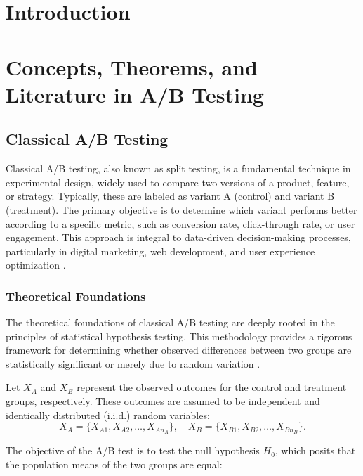 \documentclass[magisterska, english]{pwr_wmat_praca_dyplomowa}
\theoremstyle{plain}
\numberwithin{theorem}{chapter}
\theoremstyle{definition}
\numberwithin{theorem}{chapter}
\begin{document}
\frontmatter
\maketitle
\mainmatter
\tableofcontents
{\backmatter \chapter{Introduction}} 

\chapter{Concepts, Theorems, and Literature in A/B Testing}


\section{Classical A/B Testing}

Classical A/B testing, also known as split testing, is a fundamental technique in experimental design, widely used to compare two versions of a product, feature, or strategy. Typically, these are labeled as variant A (control) and variant B (treatment). The primary objective is to determine which variant performs better according to a specific metric, such as conversion rate, click-through rate, or user engagement. This approach is integral to data-driven decision-making processes, particularly in digital marketing, web development, and user experience optimization \cite{Kohavi2007}.

\subsection{Theoretical Foundations}

The theoretical foundations of classical A/B testing are deeply rooted in the principles of statistical hypothesis testing. This methodology provides a rigorous framework for determining whether observed differences between two groups are statistically significant or merely due to random variation \cite{Fisher1925}.

Let \( X_A \) and \( X_B \) represent the observed outcomes for the control and treatment groups, respectively. These outcomes are assumed to be independent and identically distributed (i.i.d.) random variables:
\[
X_A = \{X_{A1}, X_{A2}, \dots, X_{A n_A}\}, \quad X_B = \{X_{B1}, X_{B2}, \dots, X_{B n_B}\}.
\]

The objective of the A/B test is to test the null hypothesis \( H_0 \), which posits that the population means of the two groups are equal:
\end{document}
